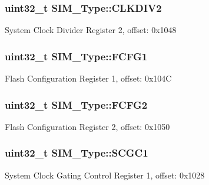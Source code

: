 \subsubsection[{\texorpdfstring{C\+L\+K\+D\+I\+V2}{CLKDIV2}}]{ uint32\+\_\+t S\+I\+M\+\_\+\+Type\+::\+C\+L\+K\+D\+I\+V2}\hypertarget{structSIM__Type_acb256e25d3f9b2bf456031820febb4ad}{}\label{structSIM__Type_acb256e25d3f9b2bf456031820febb4ad}
System Clock Divider Register 2, offset\+: 0x1048 
\subsubsection[{\texorpdfstring{F\+C\+F\+G1}{FCFG1}}]{ uint32\+\_\+t S\+I\+M\+\_\+\+Type\+::\+F\+C\+F\+G1}\hypertarget{structSIM__Type_ad08521bc1b834684ec167d3df1ca795d}{}\label{structSIM__Type_ad08521bc1b834684ec167d3df1ca795d}
Flash Configuration Register 1, offset\+: 0x104C 
\subsubsection[{\texorpdfstring{F\+C\+F\+G2}{FCFG2}}]{ uint32\+\_\+t S\+I\+M\+\_\+\+Type\+::\+F\+C\+F\+G2}\hypertarget{structSIM__Type_a6a16a2d49b11f46bd5874de212f1899e}{}\label{structSIM__Type_a6a16a2d49b11f46bd5874de212f1899e}
Flash Configuration Register 2, offset\+: 0x1050 
\subsubsection[{\texorpdfstring{S\+C\+G\+C1}{SCGC1}}]{ uint32\+\_\+t S\+I\+M\+\_\+\+Type\+::\+S\+C\+G\+C1}\hypertarget{structSIM__Type_a737f06d2d95f8b7528fd37114603da00}{}\label{structSIM__Type_a737f06d2d95f8b7528fd37114603da00}
System Clock Gating Control Register 1, offset\+: 0x1028 
